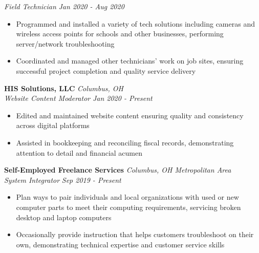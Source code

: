 \documentclass[letterpaper]{article}
\newenvironment{tightitemize}{%
  \begin{itemize}\small\setlength{\baselineskip}{0.95\baselineskip}\itemsep -1mm%
}{\end{itemize}}
\begin{document}
    \textit{Field Technician} \hfill \textsl{Jan 2020 - Aug 2020}\\
    \vspace{-7pt}
    \begin{tightitemize} \itemsep -1mm
        
            \item Programmed and installed a variety of tech solutions including cameras and wireless access points for schools and other businesses, performing server/network troubleshooting
            
            \item Coordinated and managed other technicians' work on job sites, ensuring successful project completion and quality service delivery

    \end{tightitemize}
    \vspace{-2mm}

    \textbf{HIS Solutions, LLC} \hfill \textsl{Columbus, OH}\\
    
    \textit{Website Content Moderator} \hfill \textsl{Jan 2020 - Present}\\
    \vspace{-7pt}
    \begin{tightitemize} \itemsep -1mm
        
            \item Edited and maintained website content ensuring quality and consistency across digital platforms
            
            \item Assisted in bookkeeping and reconciling fiscal records, demonstrating attention to detail and financial acumen

    \end{tightitemize}
    \vspace{-2mm}

    \textbf{Self-Employed Freelance Services} \hfill \textsl{Columbus, OH Metropolitan Area}\\
    
    \textit{System Integrator} \hfill \textsl{Sep 2019 - Present}\\
    \vspace{-7pt}
    \begin{tightitemize} \itemsep -1mm
        
            \item Plan ways to pair individuals and local organizations with used or new computer parts to meet their computing requirements, servicing broken desktop and laptop computers
            
            \item Occasionally provide instruction that helps customers troubleshoot on their own, demonstrating technical expertise and customer service skills

    \end{tightitemize}
    \vspace{-2mm}
    
\end{document}
